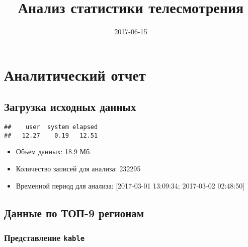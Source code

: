 \documentclass[12pt,]{article}
\title{Анализ статистики телесмотрения}
\author{}
\date{2017-06-15}
\providecommand{\tightlist}{%
  \setlength{\itemsep}{0pt}\setlength{\parskip}{0pt}}
\begin{document}
\maketitle

\section{Аналитический отчет}\label{-}

\subsection{Загрузка исходных данных}\label{--}

\begin{verbatim}
##    user  system elapsed 
##   12.27    0.19   12.51
\end{verbatim}

\begin{itemize}
\tightlist
\item
  Объем данных: 18.9 Мб.
\item
  Количество записей для анализа: 232295
\item
  Временной период для анализа: {[}2017-03-01 13:09:34; 2017-03-02
  02:48:50{]}
\end{itemize}

\subsection{Данные по ТОП-9 регионам}\label{---9-}

\subsubsection{\texorpdfstring{Представление
\texttt{kable}}{Представление kable}}\label{-kable}
\end{document}
